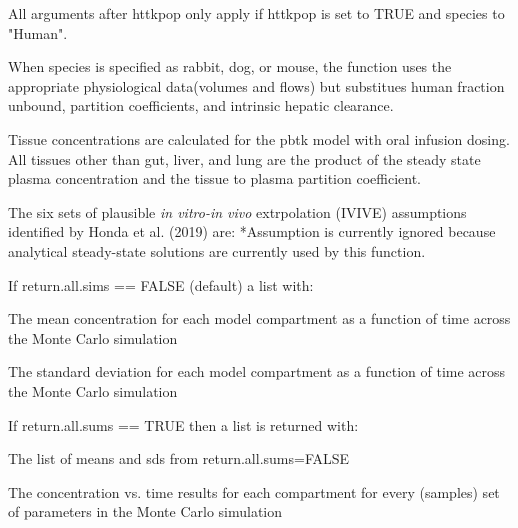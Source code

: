 \documentclass[a4paper]{book}
\begin{document}
%
\begin{Details}\relax
All arguments after httkpop only apply if httkpop is set to TRUE and species
to "Human".

When species is specified as rabbit, dog, or mouse, the function uses the
appropriate physiological data(volumes and flows) but substitues human
fraction unbound, partition coefficients, and intrinsic hepatic clearance.

Tissue concentrations are calculated for the pbtk model with oral infusion
dosing.  All tissues other than gut, liver, and lung are the product of the
steady state plasma concentration and the tissue to plasma partition
coefficient.

The six sets of plausible \emph{in vitro-in vivo} extrpolation (IVIVE)
assumptions identified by Honda et al. (2019) are: 
 *Assumption is
currently ignored because analytical steady-state solutions are currently
used by this function.
\end{Details}
%
\begin{Value}
If return.all.sims == FALSE (default) a list with:
\begin{ldescription}
\item[\code{means}] The mean concentration for each model compartment as a function
of time across the Monte Carlo simulation
\item[\code{sds}] The standard deviation for each model compartment as a function
of time across the Monte Carlo simulation

\end{ldescription}
If return.all.sums == TRUE then a list is returned with:
\begin{ldescription}
\item[\code{stats}] The list of means and sds from return.all.sums=FALSE
\item[\code{sims}] The concentration vs. time results for each compartment for 
every (samples) set of parameters in the Monte Carlo simulation
\end{ldescription}
\end{Value}
\end{document}
